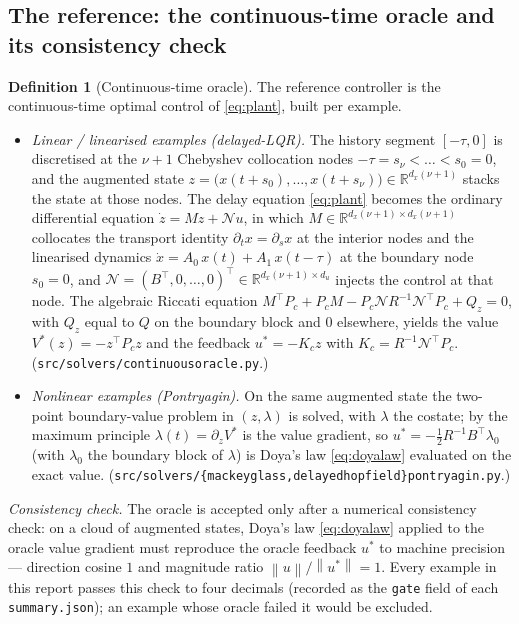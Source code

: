 \documentclass[11pt]{article}
\renewcommand{\_}{\discretionary{\textunderscore}{}{\textunderscore}}
\theoremstyle{plain}
\theoremstyle{definition}
\newtheorem{definition}[theorem]{Definition}
\newcommand{\R}{\mathbb{R}}
\newcommand{\norm}[1]{\left\lVert #1 \right\rVert}
\newcommand{\half}{\tfrac12}
\begin{document}
\subsection{The reference: the continuous-time oracle and its consistency check}

\begin{definition}[Continuous-time oracle]\label{def:oracle}
The reference controller is the continuous-time optimal control of \eqref{eq:plant}, built per
example.
\begin{itemize}
\item \emph{Linear / linearised examples (delayed-LQR).} The history segment $[-\tau,0]$ is
discretised at the $\nu+1$ Chebyshev collocation nodes $-\tau=s_{\nu}<\dots<s_{0}=0$, and
the augmented state $z=\big(x(t+s_{0}),\dots,x(t+s_{\nu})\big)\in\R^{d_x(\nu+1)}$ stacks the
state at those nodes. The delay equation \eqref{eq:plant} becomes the ordinary differential equation
$\dot z=Mz+\mathcal N u$, in which $M\in\R^{d_x(\nu+1)\times d_x(\nu+1)}$ collocates the transport
identity $\partial_{t}x=\partial_{s}x$ at the interior nodes and the linearised dynamics
$\dot x=A_{0}\,x(t)+A_{1}\,x(t-\tau)$ at the boundary node $s_{0}=0$, and
$\mathcal N=(B^{\top},0,\dots,0)^{\top}\in\R^{d_x(\nu+1)\times d_u}$ injects the control at that node. The
algebraic Riccati equation $M^{\top}P_{c}+P_{c}M-P_{c}\mathcal N R^{-1}\mathcal N^{\top}P_{c}+Q_{z}=0$,
with $Q_{z}$ equal to $Q$ on the boundary block and $0$ elsewhere, yields the value
$V^{\ast}(z)=-z^{\top}P_{c}z$ and the feedback $u^{\ast}=-K_{c}z$ with
$K_{c}=R^{-1}\mathcal N^{\top}P_{c}$. (\texttt{src/solvers/continuous\_oracle.py}.)
\item \emph{Nonlinear examples (Pontryagin).} On the same augmented state the two-point
boundary-value problem in $(z,\lambda)$ is solved, with $\lambda$ the costate; by the maximum
principle $\lambda(t)=\partial_{z}V^{\ast}$ is the value gradient, so
$u^{\ast}=-\half R^{-1}B^{\top}\lambda_{0}$ (with $\lambda_{0}$ the boundary block of $\lambda$) is
Doya's law \eqref{eq:doyalaw} evaluated on the exact value.
(\texttt{src/solvers/\{mackey\_glass,delayed\_hopfield\}\_pontryagin.py}.)
\end{itemize}
\end{definition}

\emph{Consistency check.} The oracle is accepted only after a numerical consistency check: on a
cloud of augmented states, Doya's law \eqref{eq:doyalaw} applied to the oracle value gradient must
reproduce the oracle feedback $u^{\ast}$ to machine precision --- direction cosine $1$ and
magnitude ratio $\norm{u}/\norm{u^{\ast}}=1$. Every example in this report passes this check to four
decimals (recorded as the \texttt{gate} field of each \texttt{summary.json}); an example whose oracle
failed it would be excluded.
\end{document}

